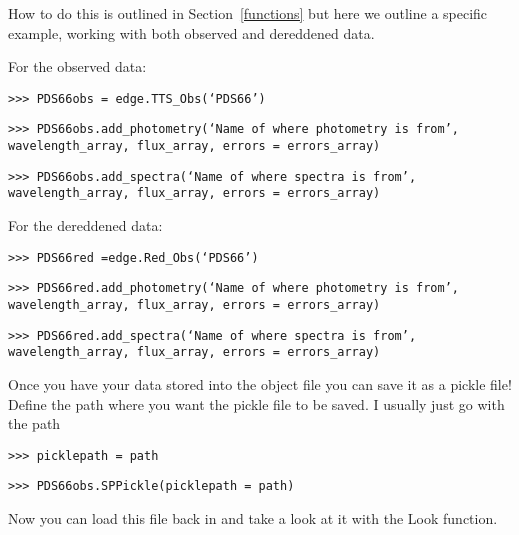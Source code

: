 \documentclass{article}
\begin{document}
How to do this is outlined in Section~\ref{functions} but here we outline a specific example, working with both observed and dereddened data.

For the observed data:

\vspace{2mm}
\texttt{>>> PDS66obs = edge.TTS\_Obs(‘PDS66’)}
\vspace{2mm}

\vspace{2mm}
\texttt{>>> PDS66obs.add\_photometry(‘Name of where photometry is from’,}\\
\texttt{wavelength\_array, flux\_array, errors = errors\_array)}
\vspace{2mm}

\vspace{2mm}
\texttt{>>> PDS66obs.add\_spectra(‘Name of where spectra is from’,}\\
\texttt{wavelength\_array, flux\_array, errors = errors\_array)}
\vspace{2mm}

For the dereddened data:

\vspace{2mm}
\texttt{>>> PDS66red =edge.Red\_Obs(‘PDS66’)}
\vspace{2mm}

\vspace{2mm}
\texttt{>>> PDS66red.add\_photometry(‘Name of where photometry is from’,}\\
\texttt{wavelength\_array, flux\_array, errors = errors\_array)}	
\vspace{2mm}

\vspace{2mm}
\texttt{>>> PDS66red.add\_spectra(‘Name of where spectra is from’,}\\
\texttt{wavelength\_array, flux\_array, errors = errors\_array)}	
\vspace{2mm}

Once you have your data stored into the object file you can save it as a pickle file!  Define the path where you want the pickle file to be saved. I usually just go with the path

\vspace{2mm}
\texttt{>>> picklepath = path}
\vspace{2mm}

\vspace{2mm}
\texttt{>>> PDS66obs.SPPickle(picklepath = path)}
\vspace{2mm}

Now you can load this file back in and take a look at it with the Look function.
\end{document}
